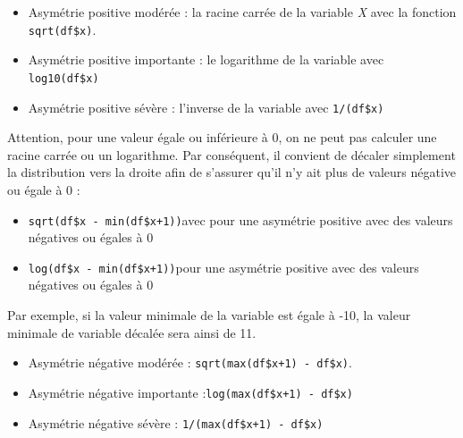 \documentclass[
  11pt,
  french,
]{book}
\makeatletter
\providecommand{\tightlist}{%
  \setlength{\itemsep}{0pt}\setlength{\parskip}{0pt}}
\newenvironment{kframev}{%
\medskip{}
\setlength{\fboxsep}{.8em}
 \def\at@end@of@kframev{}%
 \ifinner\ifhmode%
  \def\at@end@of@kframev{\end{minipage}}%
  \begin{minipage}{\columnwidth}%
 \fi\fi%
 \def\FrameCommand##1{\hskip\@totalleftmargin \hskip-\fboxsep
 \colorbox{shadebluecolor}{##1}\hskip-\fboxsep
     \hskip-\linewidth \hskip-\@totalleftmargin \hskip\columnwidth}%
 \MakeFramed {\advance\hsize-\width
   \@totalleftmargin\z@ \linewidth\hsize
   \@setminipage}}%
 {\par\unskip\endMakeFramed%
 \at@end@of@kframev}
\newenvironment{rmdblock}[1]
  {
  \begin{itemize}
  \renewcommand{\labelitemi}{
    \raisebox{-.7\height}[0pt][0pt]{
      {\setkeys{Gin}{width=3em,keepaspectratio}\texttt{[image: images/\#1]}}
    }
  }
  \setlength{\fboxsep}{1em}
  \begin{kframev}
  \small
  \item
  }
  {
  \end{kframev}
  \end{itemize}
  }
\newenvironment{bloc_astuce}
  {\begin{rmdblock}{astuce}}
  {\end{rmdblock}}
\makeatother
\begin{document}
\begin{itemize}
\tightlist
\item
  Asymétrie positive modérée : la racine carrée de la variable \emph{X} avec la fonction \texttt{sqrt(df\$x)}.
\item
  Asymétrie positive importante : le logarithme de la variable avec \texttt{log10(df\$x)}
\item
  Asymétrie positive sévère : l'inverse de la variable avec \texttt{1/(df\$x)}
\end{itemize}

\begin{bloc_astuce}

Attention, pour une valeur égale ou inférieure à 0, on ne peut pas calculer une racine carrée ou un logarithme. Par conséquent, il convient de décaler simplement la distribution vers la droite afin de s'assurer qu'il n'y ait plus de valeurs négative ou égale à 0 :

\begin{itemize}
\tightlist
\item
  \texttt{sqrt(df\$x\ -\ min(df\$x+1))}avec pour une asymétrie positive avec des valeurs négatives ou égales à 0
\item
  \texttt{log(df\$x\ -\ min(df\$x+1))}pour une asymétrie positive avec des valeurs négatives ou égales à 0
\end{itemize}

Par exemple, si la valeur minimale de la variable est égale à -10, la valeur minimale de variable décalée sera ainsi de 11.

\begin{itemize}
\tightlist
\item
  Asymétrie négative modérée : \texttt{sqrt(max(df\$x+1)\ -\ df\$x)}.
\item
  Asymétrie négative importante :\texttt{log(max(df\$x+1)\ -\ df\$x)}
\item
  Asymétrie négative sévère : \texttt{1/(max(df\$x+1)\ -\ df\$x)}
\end{itemize}

\end{bloc_astuce}
\end{document}
